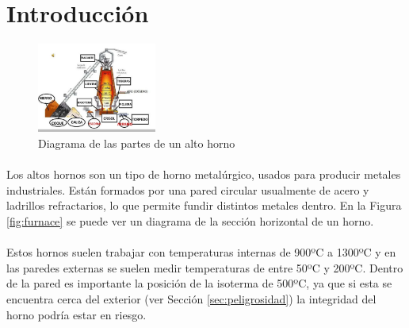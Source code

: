 \documentclass[12pt]{article}
\begin{document}

\fecha{\today}



\maketitle
\tableofcontents

\pagebreak
\section{Introducción}
\label{sec:intro}

\begin{figure}
	\centering
	\includegraphics[width=0.35\textwidth]{alto_horno}
	\caption{Diagrama de las partes de un alto horno}
	\label{fig:alto_horno}
\end{figure}

\paragraph{} Los altos hornos son un tipo de horno metalúrgico, usados para producir metales industriales. Están formados por una pared circular usualmente de acero y ladrillos refractarios, lo que permite fundir distintos metales dentro. En la Figura \ref{fig:furnace} se puede ver un diagrama de la sección horizontal de un horno.
\paragraph{} Estos hornos suelen trabajar con temperaturas internas de 900ºC a 1300ºC \cite{how.it.works} y en las paredes externas se suelen medir temperaturas de entre 50ºC y 200ºC. Dentro de la pared es importante la posición de la isoterma de 500ºC, ya que si esta se encuentra cerca del exterior (ver Sección \ref{sec:peligrosidad}) la integridad del horno podría estar en riesgo.
\end{document}

